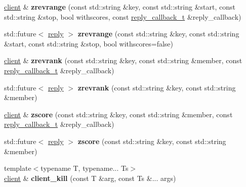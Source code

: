 \begin{DoxyCompactItemize}
\mbox{\label{classcpp__redis_1_1client_ae4cef5e8cba4196287bf89375889a2e4}} 
\hyperlink{classcpp__redis_1_1client}{client} \& {\bfseries zrevrange} (const std\+::string \&key, const std\+::string \&start, const std\+::string \&stop, bool withscores, const \hyperlink{classcpp__redis_1_1client_a061a1140d36d2eaeda82b09a0bb3f9f2}{reply\+\_\+callback\+\_\+t} \&reply\+\_\+callback)
\item 
\mbox{\label{classcpp__redis_1_1client_a973fb4632a18f70bec092f3c9659045e}} 
std\+::future$<$ \hyperlink{classcpp__redis_1_1reply}{reply} $>$ {\bfseries zrevrange} (const std\+::string \&key, const std\+::string \&start, const std\+::string \&stop, bool withscores=false)
\item 
\mbox{\label{classcpp__redis_1_1client_a459f90ba39d9f9e90df5b756ec25db8b}} 
\hyperlink{classcpp__redis_1_1client}{client} \& {\bfseries zrevrank} (const std\+::string \&key, const std\+::string \&member, const \hyperlink{classcpp__redis_1_1client_a061a1140d36d2eaeda82b09a0bb3f9f2}{reply\+\_\+callback\+\_\+t} \&reply\+\_\+callback)
\item 
\mbox{\label{classcpp__redis_1_1client_a9870e21048277805b5eac2ce710089a0}} 
std\+::future$<$ \hyperlink{classcpp__redis_1_1reply}{reply} $>$ {\bfseries zrevrank} (const std\+::string \&key, const std\+::string \&member)
\item 
\mbox{\label{classcpp__redis_1_1client_a5e0a18243dee60595c82fc4a630f6d86}} 
\hyperlink{classcpp__redis_1_1client}{client} \& {\bfseries zscore} (const std\+::string \&key, const std\+::string \&member, const \hyperlink{classcpp__redis_1_1client_a061a1140d36d2eaeda82b09a0bb3f9f2}{reply\+\_\+callback\+\_\+t} \&reply\+\_\+callback)
\item 
\mbox{\label{classcpp__redis_1_1client_a72b20e861696db3e4dd5a4af96a1b427}} 
std\+::future$<$ \hyperlink{classcpp__redis_1_1reply}{reply} $>$ {\bfseries zscore} (const std\+::string \&key, const std\+::string \&member)
\item 
\mbox{\label{classcpp__redis_1_1client_ab3095cf010e10e9aa0b17a4408e6652e}} 
{\footnotesize template$<$typename T, typename... Ts$>$ }\\\hyperlink{classcpp__redis_1_1client}{client} \& {\bfseries client\+\_\+kill} (const T \&arg, const Ts \&... args)
\end{DoxyCompactItemize}


